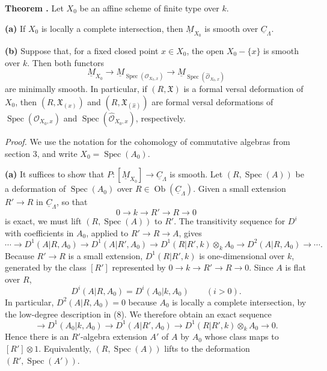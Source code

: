 
\medskip
\noindent\textbf{Theorem .}
Let $X_0$ be an affine scheme of finite type over $k$.

\smallskip
\noindent\textbf{(a)}
If $X_0$ is locally a complete intersection, then
$\underline M_{X_0}$ is smooth over $\underline C_\Lambda$.

\smallskip
\noindent\textbf{(b)}
Suppose that, for a fixed closed point $x\in X_0$, the open
$X_0-\{x\}$ is smooth over $k$. Then both functors
\[
\underline M_{X_0}
\longrightarrow
\underline M_{\operatorname{Spec}(\mathcal O_{X_0,x})}
\longrightarrow
\underline M_{\operatorname{Spec}(\widehat{\mathcal O}_{X_0,x})}
\]
are minimally smooth. In particular, if $(R,\mathfrak X)$ is a formal
versal deformation of $X_0$, then $(R,\mathfrak X_{(x)})$ and
$(R,\mathfrak X_{(\widehat x)})$ are formal versal deformations of
$\operatorname{Spec}(\mathcal O_{X_0,x})$ and
$\operatorname{Spec}(\widehat{\mathcal O}_{X_0,x})$, respectively.

\medskip
\noindent\textit{Proof.}
We use the notation for the cohomology of commutative algebras from
section 3, and write $X_0=\operatorname{Spec}(A_0)$.


\smallskip
\noindent\textbf{(a)}
It suffices to show that
$P:[\underline M_{X_0}]\longrightarrow\underline C_\Lambda$ is
smooth. Let $(R,\operatorname{Spec}(A))$ be a deformation of
$\operatorname{Spec}(A_0)$ over
$R\in\operatorname{Ob}(\underline C_\Lambda)$. Given a small
extension $R'\longrightarrow R$ in $\underline C_\Lambda$, so that
\[
0\longrightarrow k\longrightarrow R'\longrightarrow R
\longrightarrow0
\]
is exact, we must lift $(R,\operatorname{Spec}(A))$ to $R'$. The
transitivity sequence for $D^i$ with coefficients in $A_0$, applied
to $R'\longrightarrow R\longrightarrow A$, gives
\[
\cdots\longrightarrow D^1(A|R,A_0)
\longrightarrow D^1(A|R',A_0)
\longrightarrow D^1(R|R',k)\otimes_kA_0
\longrightarrow D^2(A|R,A_0)\longrightarrow\cdots .
\]
Because $R'\longrightarrow R$ is a small extension,
$D^1(R|R',k)$ is one-dimensional over $k$, generated by the class
$[R']$ represented by
$0\longrightarrow k\longrightarrow R'\longrightarrow R
\longrightarrow0$. Since $A$ is flat over $R$,
\[
D^i(A|R,A_0)=D^i(A_0|k,A_0)
\qquad(i>0).
\]
In particular, $D^2(A|R,A_0)=0$ because $A_0$ is locally a complete
intersection, by the low-degree description in (8). We therefore
obtain an exact sequence
\[
\longrightarrow D^1(A_0|k,A_0)
\longrightarrow D^1(A|R',A_0)
\longrightarrow D^1(R|R',k)\otimes_kA_0
\longrightarrow0.
\]
Hence there is an $R'$-algebra extension $A'$ of $A$ by $A_0$ whose
class maps to $[R']\otimes1$. Equivalently,
$(R,\operatorname{Spec}(A))$ lifts to the deformation
$(R',\operatorname{Spec}(A'))$.

